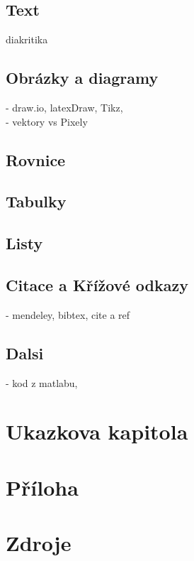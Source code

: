 \section{Text}
diakritika

\section{Obr\'{a}zky a diagramy}
 - draw.io, latexDraw, Tikz,\\
 - vektory vs Pixely

\section{Rovnice}

\section{Tabulky}

\section{Listy}

\section{Citace a K\v{r}\'{i}\v{z}ov\'{e} odkazy}
- mendeley, bibtex, cite a ref


\section{Dalsi}
- kod z matlabu,


\chapter{Ukazkova kapitola}
\label{chap:example_chapter}


\chapter{P\v{r}\'{i}loha}
\label{chap:appendix}

\chapter{Zdroje}
\label{chap:bib}



















